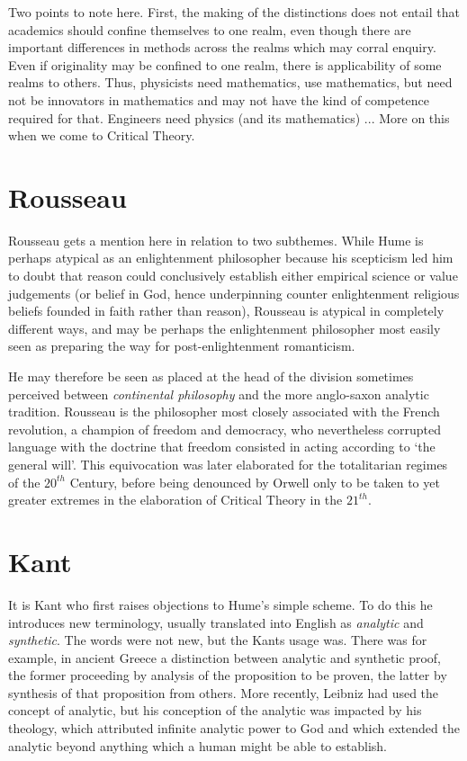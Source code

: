 \documentclass[10pt,titlepage]{book}
\begin{document}
Two points to note here.
First, the making of the distinctions does not entail that academics should confine themselves to one realm, even though there are important differences in methods across the realms which may corral enquiry.
Even if originality may be confined to one realm, there is applicability of some realms to others.
Thus, physicists need mathematics, use mathematics, but need not be innovators in mathematics and may not have the kind of competence required for that.
Engineers need physics (and its mathematics) ...
More on this when we come to Critical Theory.

\section{Rousseau}

Rousseau gets a mention here in relation to two subthemes.
While Hume is perhaps atypical as an enlightenment philosopher because his scepticism led him to doubt that reason could conclusively establish either empirical science or value judgements (or belief in God, hence underpinning counter enlightenment religious beliefs founded in faith rather than reason), Rousseau is atypical in completely different ways, and may be perhaps the enlightenment philosopher most easily seen as preparing the way for post-enlightenment romanticism.\cite{berlinRR}


He may therefore be seen as placed at the head of the division sometimes perceived between \emph{continental philosophy} and the more anglo-saxon analytic tradition.
Rousseau is the philosopher most closely associated with the French revolution, a champion of freedom and democracy, who nevertheless corrupted language with the doctrine that freedom consisted in acting according to `the general will'.
This equivocation was later elaborated for the totalitarian regimes of the $20^{th}$ Century, before being denounced by Orwell \cite{orwell-1984} only to be taken to yet greater extremes in the elaboration of Critical Theory in the $21^{th}$.


\section{Kant}

It is Kant who first raises objections to Hume's simple scheme.
To do this he introduces new terminology, usually translated into English as \emph{analytic} and \emph{synthetic}.
The words were not new, but the Kants usage was.
There was for example, in ancient Greece a distinction between analytic and synthetic proof, the former proceeding by analysis of the proposition to be proven, the latter by synthesis of that proposition from others.
More recently, Leibniz had used the concept of analytic, but his conception of the analytic was impacted by his theology, which attributed infinite analytic power to God and which extended the analytic beyond anything which a human might be able to establish.
\end{document}

